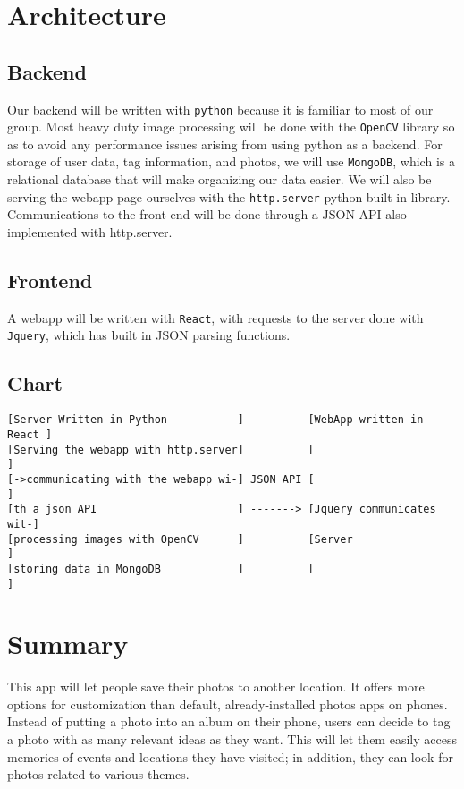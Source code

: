 \documentclass{article}
\begin{document}
\section{Architecture}
\subsection{Backend}
Our backend will be written with \texttt{python} because it is familiar to most
of our group. Most heavy duty image processing will be done with the
\texttt{OpenCV} library so as to avoid any performance issues arising from using
python as a backend. For storage of user data, tag information, and photos, we
will use \texttt{MongoDB}, which is a relational database that will make
organizing our data easier. We will also be serving the webapp page ourselves
with the \texttt{http.server} python built in library. Communications to the
front end will be done through a JSON API also implemented with http.server.

\subsection{Frontend}
A webapp will be written with \texttt{React}, with requests to the server done
with \texttt{Jquery}, which has built in JSON parsing functions.

\subsection{Chart}
\begin{verbatim}
[Server Written in Python           ]          [WebApp written in React ]
[Serving the webapp with http.server]          [                        ]
[->communicating with the webapp wi-] JSON API [                        ]
[th a json API                      ] -------> [Jquery communicates wit-]
[processing images with OpenCV      ]          [Server                  ]
[storing data in MongoDB            ]          [                        ]
\end{verbatim}

\section{Summary}
This app will let people save their photos to another location. It offers more
options for customization than default, already-installed photos apps on phones.
Instead of putting a photo into an album on their phone, users can decide to tag
a photo with as many relevant ideas as they want. This will let them easily access
memories of events and locations they have visited; in addition, they can look
for photos related to various themes.
\end{document}
